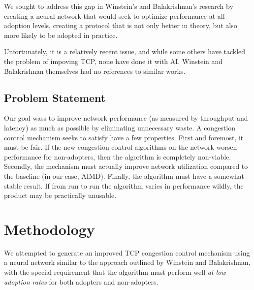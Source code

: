 \documentclass[conference]{IEEEtran}
\begin{document}
We sought to address this gap in Winstein's and Balakrishnan's research by
creating a neural network that would seek to optimize performance at all
adoption levels, creating a protocol that is not only better in theory, but also
more likely to be adopted in practice.

Unfortunately, it is a relatively recent issue, and while some others have tackled the problem of impoving TCP, none have done it with AI. Winstein and Balakrishnan themselves had no references to similar works.

\subsection{Problem Statement}
Our goal wass to improve network performance (as measured by throughput and
latency) as much as possible by eliminating unnecessary waste. A congestion
control mechanism seeks to satisfy have a few properties. First and foremost, it
must be fair. If the new congestion control algorithms on the network worsen
performance for non-adopters, then the algorithm is completely non-viable.
Secondly, the mechanism must actually improve network utilization compared to
the baseline (in our case, AIMD). Finally, the algorithm must have a somewhat
stable result. If from run to run the algorithm varies in performance wildly, 
the product may be practically unusable.

\section{Methodology}
We attempted to generate an improved TCP congestion control mechanism using a
neural network similar to the approach outlined by Winstein and Balakrishnan,
with the special requirement that the algorithm must perform well \textit{at low
adoption rates} for both adopters and non-adopters. 
\end{document}
